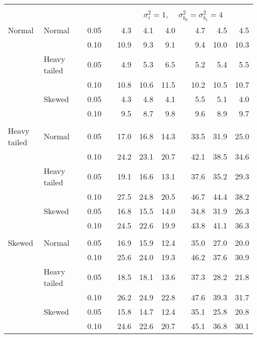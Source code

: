 \begin{table}[ht]
\begin{scriptsize}
\begin{center}
\begin{tabular}{ll p{.1cm} c p{.1cm} rrr p{.1cm} rrr}
&&&&&&&&&&&\\
& && && \multicolumn{7}{c}{$\sigma_{\varepsilon}^2 = 1$, \ \ $\sigma_{b_0}^2 = \sigma_{b_1}^2 = 4$} \\ \cline{6-12}
\rowcolor{gray!20}Normal       & Normal       && 0.05 &&   4.3 & 4.1 & 4.0 &   & 4.7 & 4.5 & 4.5 \\ 
\rowcolor{gray!20}             &              && 0.10 &&   10.9 & 9.3 & 9.1 &   & 9.4 & 10.0 & 10.3 \\ 
\rowcolor{gray!20}             & Heavy tailed && 0.05 &&   4.9 & 5.3 & 6.5 &   & 5.2 & 5.4 & 5.5 \\ 
\rowcolor{gray!20}             &              && 0.10 &&   10.8 & 10.6 & 11.5 &   & 10.2 & 10.5 & 10.7 \\ 
\rowcolor{gray!20}             & Skewed       && 0.05 &&   4.3 & 4.8 & 4.1 &   & 5.5 & 5.1 & 4.0 \\ 
\rowcolor{gray!20}             &              && 0.10 &&   9.5 & 8.7 & 9.8 &   & 9.6 & 8.9 & 9.7 \\ 
&&&&&&&&&&&\\
Heavy tailed & Normal       && 0.05 &&   17.0 & 16.8 & 14.3 &   & 33.5 & 31.9 & 25.0 \\ 
             &              && 0.10 &&   24.2 & 23.1 & 20.7 &   & 42.1 & 38.5 & 34.6 \\ 
             & Heavy tailed && 0.05 &&   19.1 & 16.6 & 13.1 &   & 37.6 & 35.2 & 29.3 \\ 
             &              && 0.10 &&   27.5 & 24.8 & 20.5 &   & 46.7 & 44.4 & 38.2 \\ 
             & Skewed       && 0.05 &&   16.8 & 15.5 & 14.0 &   & 34.8 & 31.9 & 26.3 \\ 
             &              && 0.10 &&   24.5 & 22.6 & 19.9 &   & 43.8 & 41.1 & 36.3 \\ 
&&&&&&&&&&&\\
Skewed       & Normal       && 0.05 &&   16.9 & 15.9 & 12.4 &   & 35.0 & 27.0 & 20.0 \\ 
             &              && 0.10 &&   25.6 & 24.0 & 19.3 &   & 46.2 & 37.6 & 30.9 \\ 
             & Heavy tailed && 0.05 &&   18.5 & 18.1 & 13.6 &   & 37.3 & 28.2 & 21.8 \\ 
             &              && 0.10 &&   26.2 & 24.9 & 22.8 &   & 47.6 & 39.3 & 31.7 \\ 
             & Skewed       && 0.05 &&   15.8 & 14.7 & 12.4 &   & 35.1 & 25.8 & 20.8 \\ 
             &              && 0.10 &&   24.6 & 22.6 & 20.7 &   & 45.1 & 36.8 & 30.1 \\ 

\hline
\end{tabular}
\end{center}
\end{scriptsize}
\end{table}


